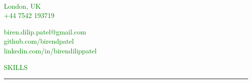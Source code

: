 \documentclass [
        11pt
] {article}
\begin{document}
\begin{multicols}{2}

\\
\noindent \textcolor{green}{London, UK}\\
\noindent \textcolor{green}{$+$44 7542 193719}\\

\columnbreak

\hspace*{\fill} \noindent \textcolor{green}{biren.dilip.patel@gmail.com}\\
\hspace*{\fill} \noindent \textcolor{green}{github.com/birendpatel}\\
\hspace*{\fill} \noindent \textcolor{green}{linkedin.com/in/birendilippatel}

\end{multicols}


\noindent\textcolor{green}{SKILLS \rule{17cm}{1pt}}

\begin{multicols}{4}

\\
\\
\\
\\

\columnbreak

\\
\\
\\
\\

\columnbreak

\\
\\
\\
\\

\columnbreak

\\
\\
\\

\end{multicols}
\end{document}
